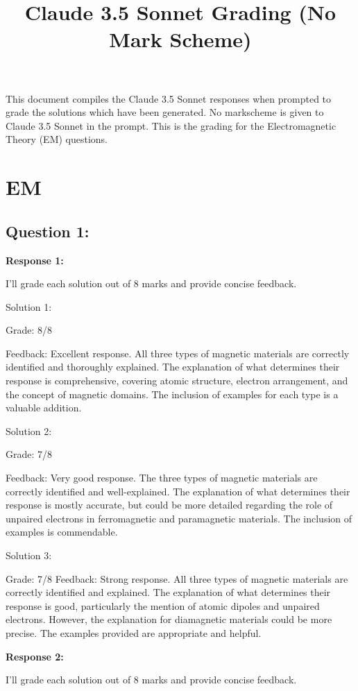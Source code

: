 \documentclass[a4paper,11pt]{article}
\title{Claude 3.5 Sonnet Grading (No Mark Scheme)}
\begin{document}
\maketitle
This document compiles the Claude 3.5 Sonnet responses when prompted to grade the solutions which have been generated. No markscheme is given to Claude 3.5 Sonnet in the prompt. This is the grading for the Electromagnetic Theory (EM) questions. 

\section{EM}
\subsection*{Question 1:}

\textbf{Response 1:}

I'll grade each solution out of 8 marks and provide concise feedback.

Solution 1:

Grade: 8/8

Feedback: Excellent response. All three types of magnetic materials are correctly identified and thoroughly explained. The explanation of what determines their response is comprehensive, covering atomic structure, electron arrangement, and the concept of magnetic domains. The inclusion of examples for each type is a valuable addition.

Solution 2:

Grade: 7/8

Feedback: Very good response. The three types of magnetic materials are correctly identified and well-explained. The explanation of what determines their response is mostly accurate, but could be more detailed regarding the role of unpaired electrons in ferromagnetic and paramagnetic materials. The inclusion of examples is commendable.

Solution 3:

Grade: 7/8
Feedback: Strong response. All three types of magnetic materials are correctly identified and explained. The explanation of what determines their response is good, particularly the mention of atomic dipoles and unpaired electrons. However, the explanation for diamagnetic materials could be more precise. The examples provided are appropriate and helpful.

\bigskip
\textbf{Response 2:}

I'll grade each solution out of 8 marks and provide concise feedback.
\end{document}
